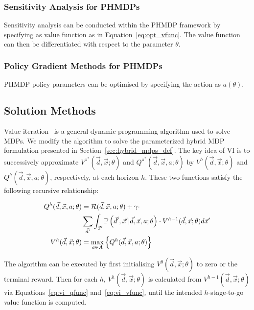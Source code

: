 \subsubsection{Sensitivity Analysis for PHMDPs}

Sensitivity analysis can be conducted within the PHMDP framework by specifying as value function as in Equation~\eqref{eq:opt_vfunc}. The value function can then be differentiated with respect to the parameter {\footnotesize $ \theta $}.

\subsubsection{Policy Gradient Methods for PHMDPs}

PHMDP policy parameters can be optimised by specifying the action {\footnotesize \Action} as {\footnotesize $ a(\theta) $}.

\subsection{Solution Methods}

Value iteration~\parencite{Bellman_PU_1957} is a general dynamic programming algorithm used to solve MDPs. We modify the algorithm to solve the parameterized hybrid MDP formulation presented in Section~\ref{sec:hybrid_mdps_def}. The key idea of VI is to successively approximate {\footnotesize $V^{\pi^{*}}(\vec{d}, \vec{x}; \theta)$} and {\footnotesize $Q^{\pi^{*}}(\vec{d}, \vec{x}, a; \theta)$} by {\footnotesize $V^{h}(\vec{d}, \vec{x}; \theta)$} and {\footnotesize $Q^{h}(\vec{d}, \vec{x}, a; \theta)$}, respectively, at each horizon {\footnotesize$h$}. These two functions satisfy the following recursive relationship:

{\footnotesize 
    \abovedisplayskip=0pt
    \belowdisplayskip=0pt
    \begin{align}
        Q^{h}(\vec{d}, \vec{x}, a; \theta) &= \mathcal{R}(\vec{d}, \vec{x}, a; \theta) + \gamma \cdot  \nonumber \\ 
        & \sum_{\vec{d}'} \int_{\vec{x}'} \mathbb{P}\left({\vec{d}', \vec{x}' | \vec{d}, \vec{x}, a; \theta}\right) \cdot V^{h-1}(\vec{d}, \vec{x}; \theta) d\vec{x}' \label{eq:vi_qfunc} \\
        V^{h}(\vec{d}, \vec{x}; \theta) &= \max_{a \in A} \left\{ Q^{h}(\vec{d}, \vec{x}, a; \theta) \right\} \label{eq:vi_vfunc}
    \end{align}
}%

The algorithm can be executed by first initialising {\footnotesize $V^{0}(\vec{d}, \vec{x}; \theta)$}  to zero or the terminal reward. Then for each {\footnotesize$h$}, {\footnotesize $V^{h}(\vec{d}, \vec{x}; \theta)$} is calculated from {\footnotesize $V^{h-1}(\vec{d}, \vec{x}; \theta)$} via Equations~\eqref{eq:vi_qfunc} and~\eqref{eq:vi_vfunc}, until the intended $h$-stage-to-go value function is computed. 

